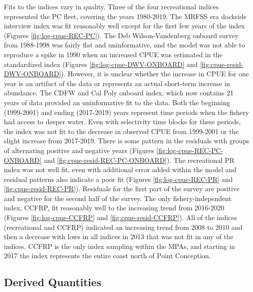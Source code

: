 \documentclass[11pt,
  english,
]{article}
\begin{document}
Fits to the indices vary in quality. Three of the four recreational indices represented the PC fleet, covering the years 1980-2019. The MRFSS era dockside interview index was fit reasonably well except for the first few years of the index (Figures \ref{fig:log-cpue-REC-PC}). The Deb Wilson-Vandenberg onboard survey from 1988-1998 was fairly flat and uninformative, and the model was not able to reproduce a spike in 1990 when an increased CPUE was estimated in the standardized index (Figures \ref{fig:log-cpue-DWV-ONBOARD} and \ref{fig:cpue-resid-DWV-ONBOARD}). However, it is unclear whether the increase in CPUE for one year is an artifact of the data or represents an actual short-term increase in abundance. The CDFW and Cal Poly onboard index, which now contains 21 years of data provided an uninformative fit to the data. Both the beginning (1999-2001) and ending (2017-2019) years represent time periods when the fishery had access to deeper water. Even with selectivity time blocks for these periods, the index was not fit to the decrease in observed CPUE from 1999-2001 or the slight increase from 2017-2019. There is some pattern in the residuals with groups of alternating positive and negative years (Figures \ref{fig:log-cpue-REC-PC-ONBOARD} and \ref{fig:cpue-resid-REC-PC-ONBOARD}). The recreational PR index was not well fit, even with additional error added within the model and residual patterns also indicate a poor fit (Figures \ref{fig:log-cpue-REC-PR} and \ref{fig:cpue-resid-REC-PR}). Residuals for the first part of the survey are positive and negative for the second half of the survey. The only fishery-independent index, CCFRP, fit reasonably well to the increasing trend from 2016-2020 (Figures \ref{fig:log-cpue-CCFRP} and \ref{fig:cpue-resid-CCFRP}). All of the indices (recreational and CCFRP) indicated an increasing trend from 2008 to 2010 and then a decrease with lows in all indices in 2013 that was not fit in any of the indices. CCFRP is the only index sampling within the MPAs, and starting in 2017 the index represents the entire coast north of Point Conception.


\hypertarget{derived-quantities}{%
\subsection{Derived Quantities}\label{derived-quantities}}

\leavevmode\tagmcend\tagstructend
\end{document}
